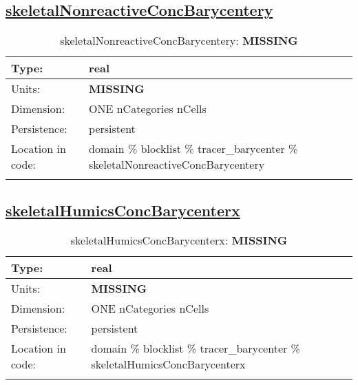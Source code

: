 \subsection[skeletalNonreactiveConcBarycentery]{\hyperref[sec:var_tab_tracer_barycenter]{skeletalNonreactiveConcBarycentery}}
\label{subsec:var_sec_tracer_barycenter_skeletalNonreactiveConcBarycentery}
\begin{center}
\begin{longtable}{| p{2.0in} | p{4.0in} |}
        \hline 
        Type: & real \\
        \hline 
        Units: & {\bf \color{red} MISSING} \\
        \hline 
        Dimension: & ONE nCategories nCells \\
        \hline 
        Persistence: & persistent \\
        \hline 
         Location in code: & domain \% blocklist \% tracer\_barycenter \% skeletalNonreactiveConcBarycentery \\
         \hline 
    \caption{skeletalNonreactiveConcBarycentery: {\bf \color{red} MISSING}}
\end{longtable}
\end{center}
\subsection[skeletalHumicsConcBarycenterx]{\hyperref[sec:var_tab_tracer_barycenter]{skeletalHumicsConcBarycenterx}}
\label{subsec:var_sec_tracer_barycenter_skeletalHumicsConcBarycenterx}
\begin{center}
\begin{longtable}{| p{2.0in} | p{4.0in} |}
        \hline 
        Type: & real \\
        \hline 
        Units: & {\bf \color{red} MISSING} \\
        \hline 
        Dimension: & ONE nCategories nCells \\
        \hline 
        Persistence: & persistent \\
        \hline 
         Location in code: & domain \% blocklist \% tracer\_barycenter \% skeletalHumicsConcBarycenterx \\
         \hline 
    \caption{skeletalHumicsConcBarycenterx: {\bf \color{red} MISSING}}
\end{longtable}
\end{center}
